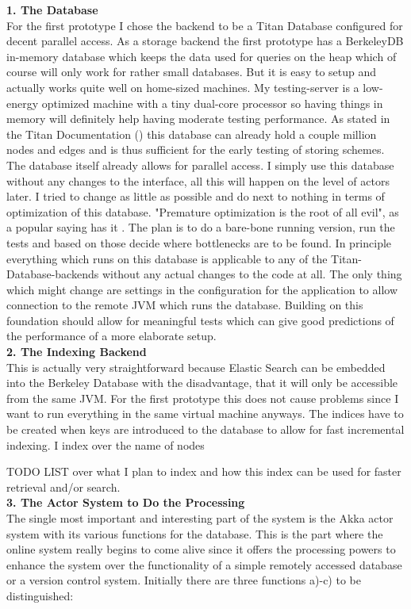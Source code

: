 \documentclass[twoside, 11pt]{scrartcl}
\begin{document}
\textbf{1. The Database}\\
For the first prototype I chose the backend to be a Titan Database configured for decent parallel access. As a storage backend the first prototype has a BerkeleyDB in-memory database which keeps the data used for queries on the heap which of course will only work for rather small databases. But it is easy to setup and actually works quite well on home-sized machines. My testing-server is a low-energy optimized machine with a tiny dual-core processor so having things in memory will definitely help having moderate testing performance. As stated in the Titan Documentation (\cite{link:titanWithBerkeley}) this database can already hold a couple million nodes and edges and is thus sufficient for the early testing of storing schemes. 
The database itself already allows for parallel access. I simply use this database without any changes to the interface, all this will happen on the level of actors later. I tried to change as little as possible and do next to nothing in terms of optimization of this database. "Premature optimization is the root of all evil", as a popular saying has it \cite{quote:rootEvil}. The plan is to do a bare-bone running version, run the tests and based on those decide where bottlenecks are to be found.
In principle everything which runs on this database is applicable to any of the Titan-Database-backends without any actual changes to the code at all. The only thing which might change are settings in the configuration for the application to allow connection to the remote JVM which runs the database.
Building on this foundation should allow for meaningful tests which can give good predictions of the performance of a more elaborate setup.\\

\textbf{2. The Indexing Backend}\\
This is actually very straightforward because Elastic Search can be embedded into the Berkeley Database with the disadvantage, that it will only be accessible from the same JVM. For the first prototype this does not cause problems since I want to run everything in the same virtual machine anyways. 
The indices have to be created when keys are introduced to the database to allow for fast incremental indexing. I index over the name of nodes 

TODO LIST over what I plan to index and how this index can be used for faster retrieval and/or search.	\\

\textbf{3. The Actor System to Do the Processing}\\	
The single most important and interesting part of the system is the Akka actor system with its various functions for the database. This is the part where the online system really begins to come alive since it offers the processing powers to enhance the system over the functionality of a simple remotely accessed database or a version control system. 
Initially there are three functions a)-c) to be distinguished:\\
\end{document}
